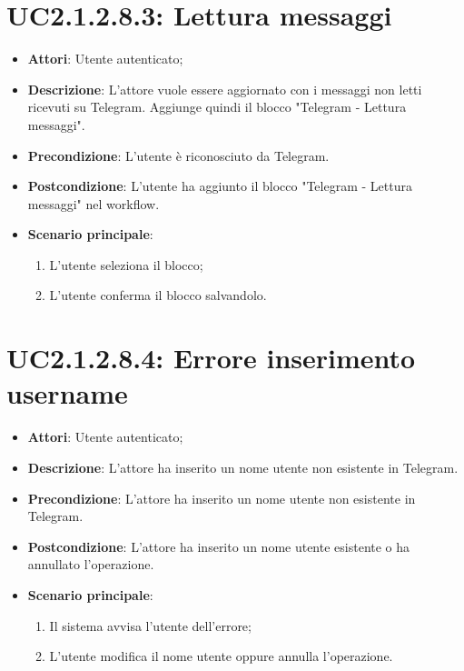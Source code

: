 \section{UC2.1.2.8.3: Lettura messaggi }
\label{UC2.1.2.8.3}
\begin{itemize}
	\item \textbf{Attori}: Utente autenticato;
	\item \textbf{Descrizione}: L'attore vuole essere aggiornato con i messaggi non letti ricevuti su Telegram. Aggiunge quindi il blocco "Telegram - Lettura messaggi".
	\item \textbf{Precondizione}: L'utente è riconosciuto da Telegram.
	\item \textbf{Postcondizione}: L'utente ha aggiunto il blocco "Telegram - Lettura messaggi" nel workflow.
	\item \textbf{Scenario principale}:
	\begin{enumerate} \item L'utente seleziona il blocco; \item  L'utente conferma il blocco salvandolo.\end{enumerate}
\end{itemize}

\section{UC2.1.2.8.4: Errore inserimento username}
\label{UC2.1.2.8.4}
\begin{itemize}
	\item \textbf{Attori}: Utente autenticato;
	\item \textbf{Descrizione}: L'attore ha inserito un nome utente non esistente in Telegram.
	\item \textbf{Precondizione}: L'attore ha inserito un nome utente non esistente in Telegram.
	\item \textbf{Postcondizione}: L'attore ha inserito un nome utente esistente o ha annullato l'operazione.
	\item \textbf{Scenario principale}:
	\begin{enumerate} \item Il sistema avvisa l'utente dell'errore;  \item  L'utente modifica il nome utente oppure annulla l'operazione.\end{enumerate}
\end{itemize}

